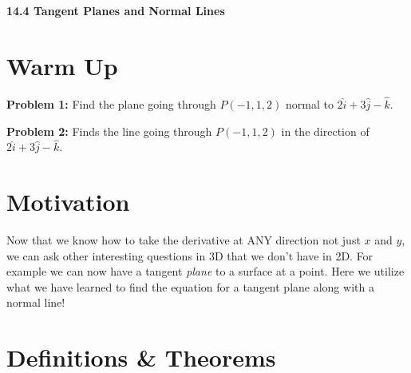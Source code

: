 \documentclass[11pt]{article}
\newcommand{\vs}{\vspace*{.1in}}
\begin{document}
\begin{LARGE}\begin{center}\bf 14.4 Tangent Planes and Normal Lines\end{center}
\end{LARGE}

\vs\vs



\section{Warm Up}
\textbf{Problem 1:} Find the plane going through $P(-1,1,2)$ normal to $2\hat{i}+3\hat{j}-\hat{k}$.

\textbf{Problem 2:} Finds the line going through $P(-1,1,2)$ in the direction of $2\hat{i}+3\hat{j}-\hat{k}$.



\section{Motivation}

Now that we know how to take the derivative at ANY direction not just $x$ and $y$, we can ask other interesting questions in 3D that we don't have in 2D. For example we can now have a tangent \emph{plane} to a surface at a point. Here we utilize what we have learned to find the equation for a tangent plane along with a normal line!

\section{Definitions \& Theorems}
\end{document}
